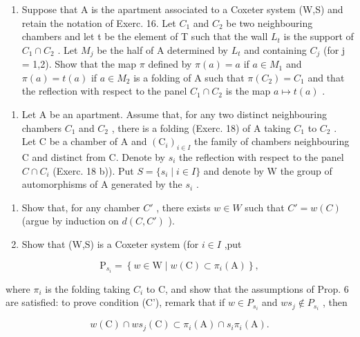 \begin{enumerate}
\def\labelenumi{\alph{enumi})}
\setcounter{enumi}{2}
\tightlist
\item
  Suppose that A is the apartment associated to a Coxeter system (W,S) and retain the notation of Exerc. 16. Let \(C_{1}\) and \(C_{2}\) be two neighbouring chambers and let t be the element of T such that the wall \(L_{t}\) is the support of \(C_{1} \cap C_{2}\) . Let \(M_{j}\) be the half of A determined by \(L_{t}\) and containing \(C_{j}\) (for j = 1,2). Show that the map \(\pi\) defined by \(\pi(a) = a\) if \(a \in M_{1}\) and \(\pi(a) = t(a)\) if \(a \in M_{2}\) is a folding of A such that \(\pi(C_{2}) = C_{1}\) and that the reflection with respect to the panel \(C_{1} \cap C_{2}\) is the map \(a \mapsto t(a)\) .
\end{enumerate}

\begin{enumerate}
\def\labelenumi{\arabic{enumi})}
\setcounter{enumi}{18}
\tightlist
\item
  Let A be an apartment. Assume that, for any two distinct neighbouring chambers \(C_{1}\) and \(C_{2}\) , there is a folding (Exerc. 18) of A taking \(C_{1}\) to \(C_{2}\) . Let C be a chamber of A and \((\mathrm{C}_{i})_{i\in I}\) the family of chambers neighbouring C and distinct from C. Denote by \(s_{i}\) the reflection with respect to the panel \(C\cap C_{i}\) (Exerc. 18 b)). Put \(S=\{s_{i}\mid i\in I\}\) and denote by W the group of automorphisms of A generated by the \(s_{i}\) .
\end{enumerate}

\begin{enumerate}
\def\labelenumi{\alph{enumi})}
\item
  Show that, for any chamber \(C'\) , there exists \(w \in W\) such that \(C' = w(C)\) (argue by induction on \(d(C, C')\) ).
\item
  Show that (W,S) is a Coxeter system (for \(i\in I\) ,put
\end{enumerate}

\[
\mathrm{P} _ {s _ {i}} = \left\{w \in \mathrm{W} \mid w (\mathrm{C}) \subset \pi_ {i} (\mathrm{A}) \right\},
\]

where \(\pi_{i}\) is the folding taking \(C_{i}\) to C, and show that the assumptions of Prop. 6 are satisfied: to prove condition (C'), remark that if \(w \in P_{s_{i}}\) and \(ws_{j} \notin P_{s_{i}}\) , then

\[
w (\mathrm{C}) \cap w s _ {j} (\mathrm{C}) \subset \pi_ {i} (\mathrm{A}) \cap s _ {i} \pi_ {i} (\mathrm{A}).
\]

